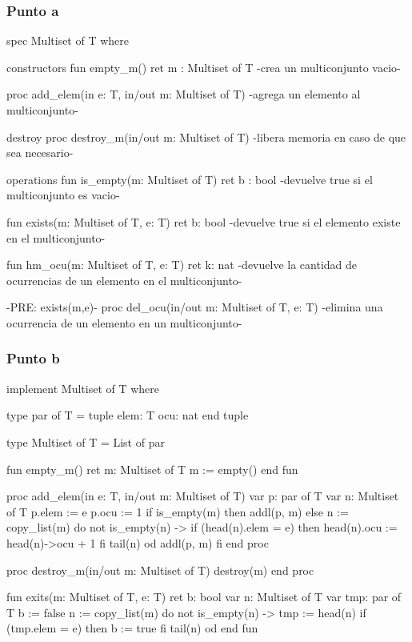 \subsubsection{Punto a}
\begin{codebox}
\begin{pascallike}
spec Multiset of T where

constructors
    fun empty_m() ret m : Multiset of T 
    {-crea un multiconjunto vacio-}

    proc add_elem(in e: T, in/out m: Multiset of T)
    {-agrega un elemento al multiconjunto-}

destroy
    proc destroy_m(in/out m: Multiset of T)
    {-libera memoria en caso de que sea necesario-}

operations
    fun is_empty(m: Multiset of T) ret b : bool
    {-devuelve true si el multiconjunto es vacio-}

    fun exists(m: Multiset of T, e: T) ret b: bool
    {-devuelve true si el elemento existe en el multiconjunto-}

    fun hm_ocu(m: Multiset of T, e: T) ret k: nat
    {-devuelve la cantidad de ocurrencias de un elemento en el multiconjunto-}

    {-PRE: exists(m,e)-}
    proc del_ocu(in/out m: Multiset of T, e: T)
    {-elimina una ocurrencia de un elemento en un multiconjunto-}
\end{pascallike}
\end{codebox}

\newpage
\subsubsection{Punto b}
\begin{codebox}
\begin{pascallike}
implement Multiset of T where

type par of T = tuple
                  elem: T
                  ocu: nat
                end tuple

type Multiset of T = List of par

fun empty_m() ret m: Multiset of T
    m := empty()
end fun

proc add_elem(in e: T, in/out m: Multiset of T)
    var p: par of T
    var n: Multiset of T
    p.elem := e
    p.ocu := 1
    if is_empty(m) then
        addl(p, m)
    else
        n := copy_list(m)
        do not is_empty(n) -> 
            if (head(n).elem = e) then
                head(n).ocu := head(n)->ocu + 1
            fi
            tail(n)
        od
        addl(p, m)
    fi
end proc

proc destroy_m(in/out m: Multiset of T)
    destroy(m)
end proc

fun exits(m: Multiset of T, e: T) ret b: bool
    var n: Multiset of T
    var tmp: par of T
    b := false
    n := copy_list(m)
    do not is_empty(n) ->
        tmp := head(n)
        if (tmp.elem = e) then
            b := true
        fi
        tail(n)
    od
end fun
\end{pascallike}
\end{codebox}

